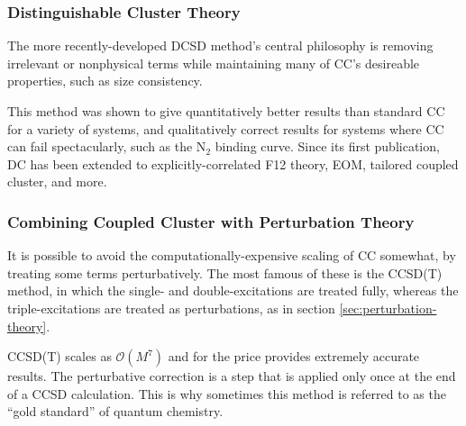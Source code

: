 \subsubsection{Distinguishable Cluster Theory}

The more recently-developed \gls{DCSD} method's central philosophy is removing irrelevant or nonphysical terms while maintaining many of CC's desireable properties, such as size consistency.\cite{katsCommunication2013}

This method was shown to give quantitatively better results than standard CC for a variety of systems, and qualitatively correct results for systems where CC can fail spectacularly, such as the N$_2$ binding curve. Since its first publication, \gls{DC} has been extended to explicitly-correlated F12 theory,\cite{katsAccurate2015} \gls{EOM},\cite{rishiExcited2017} tailored coupled cluster,\cite{vitaleFCIQMCTailored2020} and more.

\subsubsection{Combining Coupled Cluster with Perturbation Theory}

It is possible to avoid the computationally-expensive scaling of CC somewhat, by treating some terms perturbatively. The most famous of these is the \gls{CCSD(T)} method,\cite{raghavachariFifthorder1989} in which the single- and double-excitations are treated fully, whereas the triple-excitations are treated as perturbations, as in section \ref{sec:perturbation-theory}.

\gls{CCSD(T)} scales as $\mathcal{O}(M^7)$ and for the price provides extremely accurate results. The perturbative correction is a step that is applied only once at the end of a \gls{CCSD} calculation. This is why sometimes this method is referred to as the ``gold standard'' of quantum chemistry.

